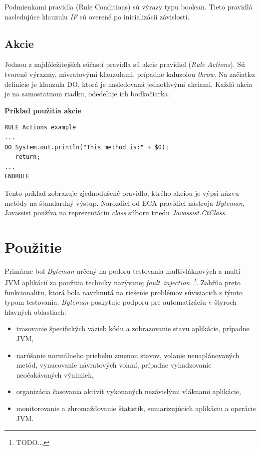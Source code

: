 \documentclass[11pt,final,oneside]{fithesis}
\newenvironment{example}[1]
{
\vspace{3mm}
\noindent\textbf{#1}
\vspace{2mm}
}
{
\vspace{3mm}
}
\begin{document}
Podmienkami pravidla (Rule Conditions) sú výrazy typu boolean. Tieto pravidlá nasledujúce klauzulu \textit{IF} sú overené po inicializácií závislostí.

\subsection{Akcie}

Jednou z najdôležitejších súčastí pravidla sú akcie pravidiel (\textit{Rule Actions}). Sú tvorené výrazmy, návratovými klauzulami, prípadne kaluzolou
\textit{throw}. Na začiatku definície je klauzula DO, ktorá je nasledovaná jednotlivými akciami. Každá akcia je na samostatnom riadku, odedeľuje ich bodkočiarka.

\begin{example}{Príklad použitia akcie}
\begin{verbatim}
RULE Actions example
...
DO System.out.println("This method is:" + $0);
   return;
...
ENDRULE
\end{verbatim}
\end{example}

Tento príklad zobrazuje zjednodušené pravidlo, ktrého akciou je výpsi názvu metódy na štandardný výstup. Narozdiel od ECA pravidiel nástroja
\textit{Byteman}, Javassist používa na reprezentáciu \textit{class} súboru triedu \textit{Javassist.CtClass}.

\section{Použitie}

Primárne bol \textit{Byteman} určený na podoru testovania multivláknových a
multi-JVM aplikácií za použitia techniky nazývanej
\textit{fault~injection~\footnote{TODO...}}. Zahŕňa preto funkcionalitu, ktorá 
bola navrhnutá na riešenie problémov súvisiacich s týmto typom testovania.
\textit{Byteman} poskytuje podporu pre automatizáciu v štyroch hlavných 
oblastiach:

\begin{itemize}
\item trasovanie špecifických väzieb kódu a zobrazovanie stavu 
aplikácie, prípadne JVM,
\item narúšanie normálneho priebehu zmenou stavov, volanie nenaplánovaných
metód, vynucovanie návratových volaní, prípadne vyhadzovanie neočakávaných 
výnimiek,
\item organizácia časovania aktivít vykonaných nezávislými vláknami aplikácie,
\item monitorovanie a zhromažďovanie štatistík, sumarizujúcich aplikáciu a
operácie JVM.
\end{itemize}
\end{document}
